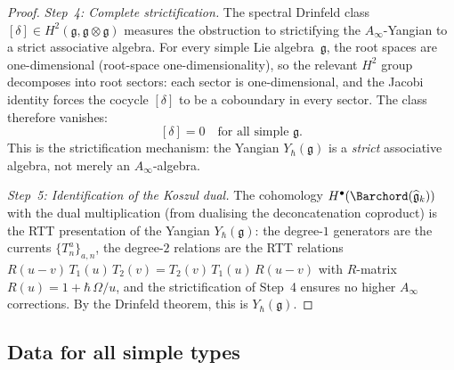 \begin{proof}
\emph{Step~4: Complete strictification.}
The spectral Drinfeld class $[\delta]\in H^2(\mathfrak{g},
\mathfrak{g}\otimes\mathfrak{g})$ measures the obstruction
to strictifying the $A_\infty$-Yangian to a strict associative
algebra. For every simple Lie algebra~$\mathfrak{g}$, the
root spaces are one-dimensional
(root-space one-dimensionality),
so the relevant $H^2$ group decomposes into root sectors:
each sector is one-dimensional, and the Jacobi identity forces
the cocycle $[\delta]$ to be a coboundary in every sector.
The class therefore vanishes:
\begin{equation}\label{eq:strictification}
[\delta] = 0
\quad\text{for all simple }\mathfrak{g}.
\end{equation}
This is the strictification mechanism: the Yangian
$Y_\hbar(\mathfrak{g})$ is a \emph{strict} associative
algebra, not merely an $A_\infty$-algebra.

\emph{Step~5: Identification of the Koszul dual.}
The cohomology $H^\bullet(\Barchord
(\widehat{\mathfrak{g}}_k))$ with the dual multiplication
(from dualising the deconcatenation coproduct) is the
RTT presentation of the Yangian $Y_\hbar(\mathfrak{g})$:
the degree-$1$ generators are the currents
$\{T^a_n\}_{a,n}$, the degree-$2$ relations are the RTT
relations $R(u-v)\,T_1(u)\,T_2(v) = T_2(v)\,T_1(u)\,R(u-v)$
with $R$-matrix $R(u) = 1 + \hbar\,\Omega/u$, and the
strictification of Step~4 ensures no higher $A_\infty$
corrections. By the Drinfeld theorem, this is
$Y_\hbar(\mathfrak{g})$.
\end{proof}

\subsection{Data for all simple types}


